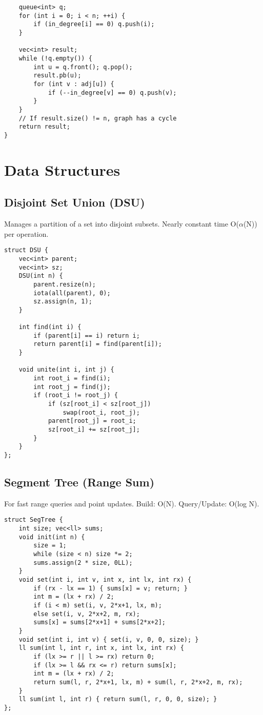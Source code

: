 \documentclass[10pt]{article}
\begin{document}
\begin{multicols}{2}
\begin{lstlisting}
    queue<int> q;
    for (int i = 0; i < n; ++i) {
        if (in_degree[i] == 0) q.push(i);
    }

    vec<int> result;
    while (!q.empty()) {
        int u = q.front(); q.pop();
        result.pb(u);
        for (int v : adj[u]) {
            if (--in_degree[v] == 0) q.push(v);
        }
    }
    // If result.size() != n, graph has a cycle
    return result;
}
\end{lstlisting}

\newpage
\section{Data Structures}

\subsection{Disjoint Set Union (DSU)}
Manages a partition of a set into disjoint subsets. Nearly constant time O($\alpha$(N)) per operation.

\begin{lstlisting}
struct DSU {
    vec<int> parent;
    vec<int> sz;
    DSU(int n) {
        parent.resize(n);
        iota(all(parent), 0);
        sz.assign(n, 1);
    }

    int find(int i) {
        if (parent[i] == i) return i;
        return parent[i] = find(parent[i]);
    }

    void unite(int i, int j) {
        int root_i = find(i);
        int root_j = find(j);
        if (root_i != root_j) {
            if (sz[root_i] < sz[root_j])
                swap(root_i, root_j);
            parent[root_j] = root_i;
            sz[root_i] += sz[root_j];
        }
    }
};
\end{lstlisting}

\subsection{Segment Tree (Range Sum)}
For fast range queries and point updates. Build: O(N). Query/Update: O(log N).

\begin{lstlisting}
struct SegTree {
    int size; vec<ll> sums;
    void init(int n) {
        size = 1;
        while (size < n) size *= 2;
        sums.assign(2 * size, 0LL);
    }
    void set(int i, int v, int x, int lx, int rx) {
        if (rx - lx == 1) { sums[x] = v; return; }
        int m = (lx + rx) / 2;
        if (i < m) set(i, v, 2*x+1, lx, m);
        else set(i, v, 2*x+2, m, rx);
        sums[x] = sums[2*x+1] + sums[2*x+2];
    }
    void set(int i, int v) { set(i, v, 0, 0, size); }
    ll sum(int l, int r, int x, int lx, int rx) {
        if (lx >= r || l >= rx) return 0;
        if (lx >= l && rx <= r) return sums[x];
        int m = (lx + rx) / 2;
        return sum(l, r, 2*x+1, lx, m) + sum(l, r, 2*x+2, m, rx);
    }
    ll sum(int l, int r) { return sum(l, r, 0, 0, size); }
};
\end{lstlisting}


\end{multicols}
\end{document}

